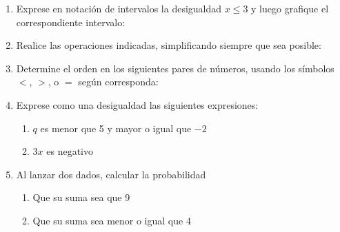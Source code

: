 \documentclass[fleqn]{article}
\begin{document}
\begin{enumerate}
  \item Exprese en notación de intervalos la desigualdad \;$ x\leq 3 $\; y luego grafique el correspondiente intervalo:
  \item Realice las operaciones indicadas, simplificando siempre que sea posible:
  \begin{enumerate}
  \end{enumerate}
  \item Determine el orden en los siguientes pares de números, usando los símbolos $<$, $>$, o $=$ según corresponda:
  \begin{enumerate}
  \end{enumerate}
  \item Exprese como una desigualdad las siguientes expresiones:
  \begin{enumerate}
    \item $ q $ es menor que 5 y mayor o igual que $ -2 $ 
    \item $3x$ es negativo 
  \end{enumerate}
  \item Al lanzar dos dados, calcular la probabilidad
  \begin{enumerate}
  \item Que su suma sea que 9
  \item Que su suma sea menor o igual que 4
  \end{enumerate}

\end{enumerate}
\end{document}
